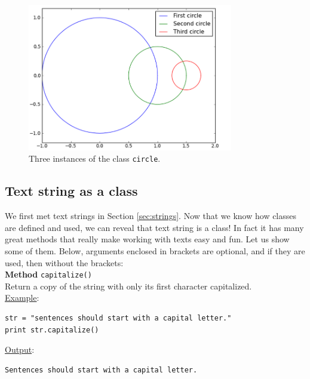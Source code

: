 \begin{figure}[!ht]
\begin{center}
\includegraphics[width=0.8\textwidth]{imgp/3circ.png}
\end{center}
\vspace{-2mm}
\caption{Three instances of the class {\tt circle}.}
\label{fig:3circ}
\end{figure}

\subsection{Text string as a class} \label{subsec:textstrclass}

We first met text strings in Section \ref{sec:strings}. Now that 
we know how classes are defined and used, we can reveal that 
text string is a class! In fact it has many great methods that 
really make working with texts easy and fun. Let us show some 
of them. Below, arguments enclosed in brackets are optional,
and if they are used, then without the brackets:\\

\noindent
{\bf Method} {\tt capitalize()}\\

\noindent
Return a copy of the string with only its first character capitalized.\\

\noindent
\underline{Example}:
\begin{verbatim}
str = "sentences should start with a capital letter."
print str.capitalize()
\end{verbatim}
\underline{Output}:
\begin{verbatim}
Sentences should start with a capital letter.
\end{verbatim}
\vspace{4mm}

